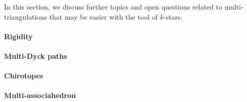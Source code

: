 \documentclass[12pt]{amsart}
\begin{document}
In this section, we discuss further topics and open questions related to multi-triangulations that may be easier with the tool of $k$-stars.


\paragraph{{\sc Rigidity}}



\paragraph{{\sc Multi-Dyck paths}}


\paragraph{{\sc Chirotopes}}



\paragraph{{\sc Multi-associahedron}}



\nocite{j-gtdfssp-05}
\nocite{cp-tttccp-92}
\nocite{i-mcg-02}



\end{document}
